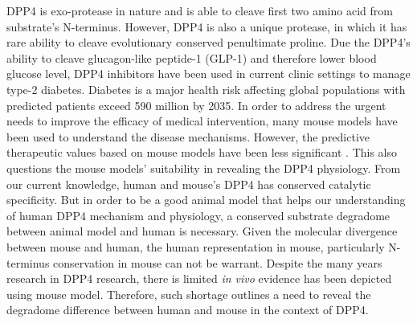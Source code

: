 DPP4 is exo-protease in nature and is able to cleave first two amino acid from substrate's N-terminus. However, DPP4 is also a unique protease, in which it has rare ability to cleave evolutionary conserved penultimate proline. Due the DPP4's ability to cleave glucagon-like peptide-1 (GLP-1) and therefore lower blood glucose level, DPP4 inhibitors have been used in current clinic settings to manage type-2 diabetes. Diabetes is a major health risk affecting global populations with predicted patients exceed 590 million by 2035. \cite{IDF_Diabetes_Atlas_Group_2015} In order to address the urgent needs to improve the efficacy of medical intervention, many mouse models have been used to understand the disease mechanisms. However, the predictive therapeutic values based on mouse models have been less significant \cite{Renner_2016, Hay_2014}. This also questions the mouse models' suitability in revealing the DPP4 physiology. From our current knowledge, human and mouse's DPP4 has conserved catalytic specificity. But in order to be a good animal model that helps our understanding of human DPP4 mechanism and physiology, a conserved substrate degradome between animal model and human is necessary. Given the molecular divergence between mouse and human, the human representation in mouse, particularly N-terminus conservation in mouse can not be warrant. Despite the many years research in DPP4 research, there is limited \textit{in vivo} evidence has been depicted using mouse model. Therefore, such shortage outlines a need to reveal the degradome difference between human and mouse in the context of DPP4. 
\\



